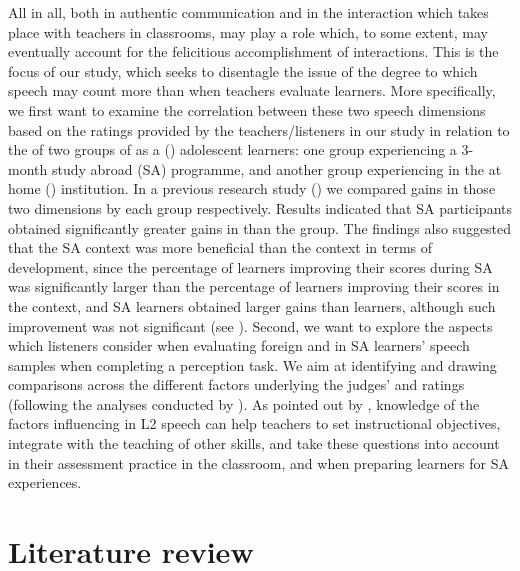 \documentclass[output=paper]{langsci/langscibook}
\begin{document}
All in all, both in authentic communication and in the interaction which takes place with teachers in classrooms,  may play a role which, to some extent, may eventually account for the felicitious accomplishment of interactions. This is the focus of our study, which seeks to disentagle the issue of the degree to which speech  may count more than  when teachers evaluate learners. More specifically, we first want to examine the correlation between these two speech dimensions based on the ratings provided by the teachers/listeners in our study  in relation to the  of two groups of  as a  () adolescent learners: one group experiencing a 3-month study abroad (SA) programme, and another group experiencing  in the at home () institution. In a previous research study (\citealt{delRío2013}) we compared gains in those two dimensions by each group respectively. Results indicated that SA participants obtained significantly greater gains in  than the  group. The findings also suggested that the SA context was more beneficial than the  context in terms of  development, since the percentage of learners improving their  scores during SA was significantly larger than the percentage of learners improving their scores in the  context, and SA learners obtained larger  gains than  learners, although such improvement was not significant (see \citealt[139--164]{delRío2013}). Second, we want to explore the aspects which listeners consider when evaluating foreign  and  in SA learners’ speech samples when completing a perception task. We aim at identifying and drawing comparisons across the different factors underlying the judges’  and  ratings (following the analyses conducted by \citealt{TrofimovichIsaacs2012}).  As pointed out by \citet{Isaacs2010}, knowledge of the factors influencing  in {L2} speech can help teachers to set instructional objectives, integrate  with the teaching of other skills, and take these questions into account in their assessment practice in the  classroom, and when preparing learners for SA experiences.


\section{Literature review}
\end{document}
